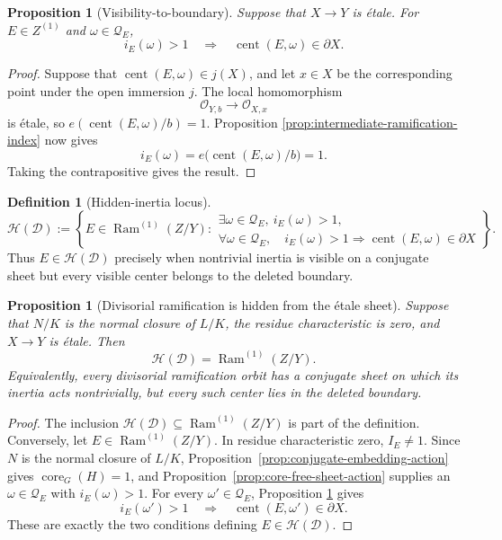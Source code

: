 \documentclass[11pt]{article}
\newtheorem{proposition}[theorem]{Proposition}
\theoremstyle{remark}
\theoremstyle{definition}
\newtheorem{definition}[theorem]{Definition}
\DeclareMathOperator{\Ram}{Ram}
\DeclareMathOperator{\core}{core}
\begin{document}
\begin{proposition}[Visibility-to-boundary]
\label{prop:visibility-to-boundary}
Suppose that \(X\to Y\) is \'etale.  For \(E\in Z^{(1)}\) and
\(\omega\in\mathcal Q_E\),
\[
  i_E(\omega)>1
  \quad\Longrightarrow\quad
  \operatorname{cent}(E,\omega)\in\partial X.
\]
\end{proposition}

\begin{proof}
Suppose that \(\operatorname{cent}(E,\omega)\in j(X)\), and let
\(x\in X\) be the corresponding point under the open immersion \(j\).
The local homomorphism
\[
  \mathcal O_{Y,b}
  \longrightarrow
  \mathcal O_{X,x}
\]
is \'etale, so
\(e(\operatorname{cent}(E,\omega)/b)=1\).  Proposition
\ref{prop:intermediate-ramification-index} now gives
\[
  i_E(\omega)
  =
  e\bigl(\operatorname{cent}(E,\omega)/b\bigr)
  =
  1.
\]
Taking the contrapositive gives the result.
\end{proof}

\begin{definition}[Hidden-inertia locus]
\label{def:no-hidden-inertia}
\[
  \mathcal H(\mathcal D)
  :=
  \left\{
  E\in\Ram^{(1)}(Z/Y):
  \begin{array}{l}
    \exists\omega\in\mathcal Q_E,\ i_E(\omega)>1,\\
    \forall\omega\in\mathcal Q_E,\quad
      i_E(\omega)>1
      \Longrightarrow
      \operatorname{cent}(E,\omega)\in\partial X
  \end{array}
  \right\}.
\]
Thus \(E\in\mathcal H(\mathcal D)\) precisely when nontrivial inertia
is visible on a conjugate sheet but every visible center belongs to the
deleted boundary.
\end{definition}

\begin{proposition}[Divisorial ramification is hidden from the \'etale sheet]
\label{prop:etale-sheet-hidden-inertia}
Suppose that \(N/K\) is the normal closure of \(L/K\), the residue
characteristic is zero, and \(X\to Y\) is \'etale.  Then
\[
  \mathcal H(\mathcal D)=\Ram^{(1)}(Z/Y).
\]
Equivalently, every divisorial ramification orbit has a conjugate sheet on
which its inertia acts nontrivially, but every such center lies in the
deleted boundary.
\end{proposition}

\begin{proof}
The inclusion
\(\mathcal H(\mathcal D)\subseteq\Ram^{(1)}(Z/Y)\) is part of the
definition.  Conversely, let \(E\in\Ram^{(1)}(Z/Y)\).  In residue
characteristic zero, \(I_E\neq1\).  Since \(N\) is the normal closure of
\(L/K\), Proposition~\ref{prop:conjugate-embedding-action} gives
\(\core_G(H)=1\), and Proposition~\ref{prop:core-free-sheet-action}
supplies an \(\omega\in\mathcal Q_E\) with \(i_E(\omega)>1\).
For every \(\omega'\in\mathcal Q_E\), Proposition
\ref{prop:visibility-to-boundary} gives
\[
  i_E(\omega')>1
  \quad\Longrightarrow\quad
  \operatorname{cent}(E,\omega')\in\partial X.
\]
These are exactly the two conditions defining
\(E\in\mathcal H(\mathcal D)\).
\end{proof}
\end{document}
